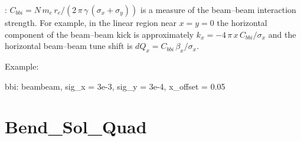 : $ C_{bbi} = 
N \, m_e \, r_e / (2 \, \pi \, \gamma \, (\sigma_x + \sigma_y))$ 
is a measure of the beam--beam interaction strength. For example,
in the linear region near $x = y = 0$ the horizontal component of the
beam--beam kick is approximately 
$k_x = -4\, \pi \, x \, C_{bbi} / \sigma_x$ and the
horizontal beam--beam tune shift is 
$dQ_x = C_{bbi} \, \beta_x / \sigma_x$.

Example:
\begin{example}
  bbi: beambeam, sig\_x = 3e-3, sig\_y = 3e-4, x\_offset = 0.05
\end{example}

\section{Bend\_Sol\_Quad}
\label{s:bsq}

